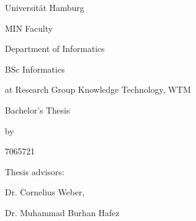 \begin{titlepage}
    \centering
    Universität Hamburg \par
    MIN Faculty \par
    Department of Informatics \par
    BSc Informatics \par
    at Research Group Knowledge Technology, WTM \par
    \vspace{6\baselineskip}
    {\Large Bachelor's Thesis\par}
    {\Huge \thetitle \par}
    \vspace{6\baselineskip}
    by\par
    {\Large \theauthor \par 7065721 \par}
    \vfill
    Thesis advisors:\par
    {\large Dr. Cornelius Weber, \par Dr. Muhammad Burhan Hafez}
\end{titlepage}
